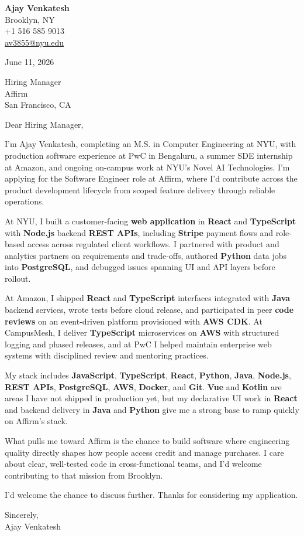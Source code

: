 \documentclass[letterpaper,11pt]{article}
\begin{document}
\begin{flushleft}
\textbf{\large Ajay Venkatesh} \\
Brooklyn, NY \\
+1 516 585 9013 \\
\href{mailto:av3855@nyu.edu}{av3855@nyu.edu}
\end{flushleft}
\vspace{10pt}
June 11, 2026
\vspace{6pt}

Hiring Manager \\
Affirm \\
San Francisco, CA

\vspace{10pt}

Dear Hiring Manager,

I'm Ajay Venkatesh, completing an M.S. in Computer Engineering at NYU, with production software experience at PwC in Bengaluru, a summer SDE internship at Amazon, and ongoing on-campus work at NYU's Novel AI Technologies. I'm applying for the Software Engineer role at Affirm, where I'd contribute across the product development lifecycle from scoped feature delivery through reliable operations.

At NYU, I built a customer-facing \textbf{web application} in \textbf{React} and \textbf{TypeScript} with \textbf{Node.js} backend \textbf{REST APIs}, including \textbf{Stripe} payment flows and role-based access across regulated client workflows. I partnered with product and analytics partners on requirements and trade-offs, authored \textbf{Python} data jobs into \textbf{PostgreSQL}, and debugged issues spanning UI and API layers before rollout.

At Amazon, I shipped \textbf{React} and \textbf{TypeScript} interfaces integrated with \textbf{Java} backend services, wrote tests before cloud release, and participated in peer \textbf{code reviews} on an event-driven platform provisioned with \textbf{AWS CDK}. At CampusMesh, I deliver \textbf{TypeScript} microservices on \textbf{AWS} with structured logging and phased releases, and at PwC I helped maintain enterprise web systems with disciplined review and mentoring practices.

My stack includes \textbf{JavaScript}, \textbf{TypeScript}, \textbf{React}, \textbf{Python}, \textbf{Java}, \textbf{Node.js}, \textbf{REST APIs}, \textbf{PostgreSQL}, \textbf{AWS}, \textbf{Docker}, and \textbf{Git}. \textbf{Vue} and \textbf{Kotlin} are areas I have not shipped in production yet, but my declarative UI work in \textbf{React} and backend delivery in \textbf{Java} and \textbf{Python} give me a strong base to ramp quickly on Affirm's stack.

What pulls me toward Affirm is the chance to build software where engineering quality directly shapes how people access credit and manage purchases. I care about clear, well-tested code in cross-functional teams, and I'd welcome contributing to that mission from Brooklyn.

I'd welcome the chance to discuss further. Thanks for considering my application.

\vspace{12pt}
Sincerely, \\
Ajay Venkatesh
\end{document}
